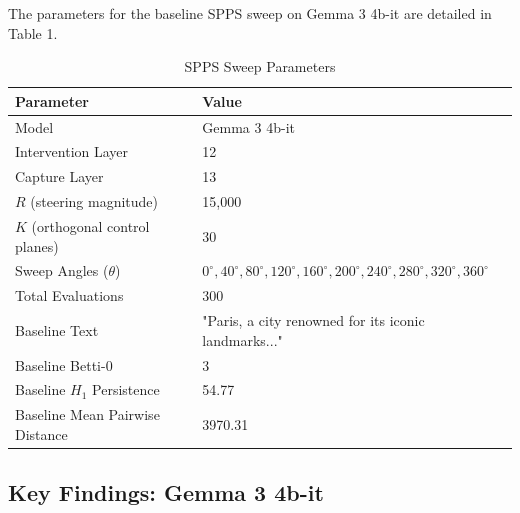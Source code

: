 \documentclass[10pt,journal,onecolumn]{article}
\begin{document}
The parameters for the baseline SPPS sweep on Gemma 3 4b-it are detailed in Table 1.

\begin{table}[htbp]
\centering
\caption{SPPS Sweep Parameters}
\label{tab:sweep_parameters}
\begin{tabular}{ll}
\toprule
\textbf{Parameter} & \textbf{Value} \\
\midrule
Model & Gemma 3 4b-it \\
Intervention Layer & 12 \\
Capture Layer & 13 \\
$R$ (steering magnitude) & 15,000 \\
$K$ (orthogonal control planes) & 30 \\
Sweep Angles ($\theta$) & $0^{\circ}, 40^{\circ}, 80^{\circ}, 120^{\circ}, 160^{\circ}, 200^{\circ}, 240^{\circ}, 280^{\circ}, 320^{\circ}, 360^{\circ}$ \\
Total Evaluations & 300 \\
Baseline Text & "Paris, a city renowned for its iconic landmarks..." \\
Baseline Betti-0 & 3 \\
Baseline $H_1$ Persistence & 54.77 \\
Baseline Mean Pairwise Distance & 3970.31 \\
\bottomrule
\end{tabular}
\end{table}

\subsection{Key Findings: Gemma 3 4b-it}
\label{sec:findings_gemma3}
\end{document}
